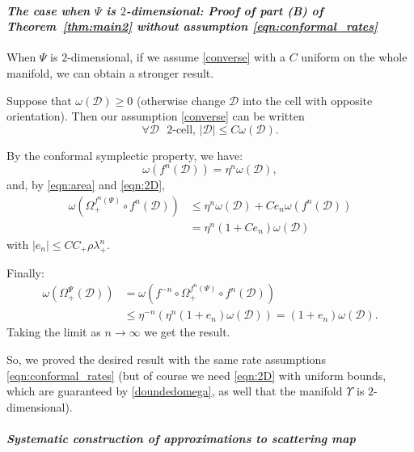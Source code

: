 \documentclass[11pt]{amsart}
\theoremstyle{definition}
\theoremstyle{remark}
\numberwithin{equation}{section}
\begin{document}
\paragraph{\em The case when $\Psi$ is $2$-dimensional:   Proof  of part \textbf{(B)}  of Theorem~\ref{thm:main2} without  assumption \eqref{eqn:conformal_rates}}
\label{sec:2DLambda}

When $\Psi$ is $2$-dimensional,
if we assume \eqref{converse} with a $C$ uniform on the whole
manifold, we can obtain a stronger result.


Suppose that $\omega(\mathscr{D}) \ge 0$  (otherwise change $\mathscr{D}$ into
the cell with opposite orientation). Then our assumption \eqref{converse} can be written
\begin{equation}\label{eqn:2D}
\forall \mathscr{D} \textrm{ $2$-cell},\, |\mathscr{D}|\le C\omega(\mathscr{D}).
\end{equation}

By the conformal symplectic property, we have:
\[
\omega( f^n(\mathscr{D}) ) = \eta^n  \omega(\mathscr{D}),
\]
and, by  \eqref{eqn:area} and \eqref{eqn:2D},
\[
\begin{split}
\omega( \Omega_+^{f^n(\Psi)} \circ  f^n(\mathscr{D}) ) &\le
\eta^n  \omega(\mathscr{D}) +  C e_n \omega(f^n(\mathscr{D}))\\
&=\eta^n(1+ C e_n) \omega(\mathscr{D})
\end{split}
\]
with $ |e_n| \le C C_+ \rho  \lambda_+^n$.


Finally:
\[
\begin{split}
\omega(\Omega_+^{\Psi}(\mathscr{D})) &=
\omega( f^{-n} \circ \Omega_+ ^{f^n(\Psi)}\circ  f^n(\mathscr{D}) ) \\
&\le
\eta^{-n}\left(  \eta^n  (1+e_n) \omega(\mathscr{D}) \right) = (1+e_n) \omega(\mathscr{D}) .
\end{split}
\]
Taking the limit as $n\to \infty$ we get the result.

So, we proved the desired result with the same rate assumptions \eqref{eqn:conformal_rates}
(but of course we need \eqref{eqn:2D} with uniform
bounds, which are guaranteed by \eqref{doundedomega}, as well that the manifold $\Upsilon$ is $2$-dimensional).

\medskip

\paragraph{\em Systematic construction of approximations to scattering map}
\label{systematic}
\end{document}
